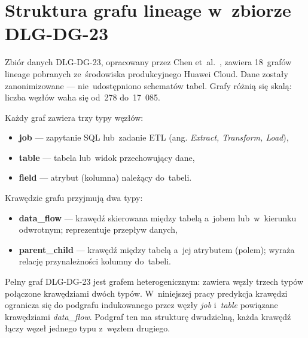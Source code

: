 \documentclass[polish,master,a4paper,oneside]{ppfcmthesis}
\begin{document}
\section{Struktura grafu lineage w~zbiorze DLG-DG-23}
\label{sec:graf_lineage}

Zbiór danych DLG-DG-23, opracowany przez Chen et~al.~\cite{Chen2024},
zawiera 18~grafów lineage pobranych ze~środowiska produkcyjnego Huawei
Cloud. Dane zostały zanonimizowane — nie~udostępniono schematów tabel.
Grafy różnią się skalą: liczba węzłów waha się od~278 do~17~085.

Każdy graf zawiera trzy typy węzłów:

\begin{itemize}
  \item \textbf{job} — zapytanie SQL lub~zadanie ETL (ang. \emph{Extract,
        Transform, Load}),
  \item \textbf{table} — tabela lub~widok przechowujący dane,
  \item \textbf{field} — atrybut (kolumna) należący do~tabeli.
\end{itemize}

Krawędzie grafu przyjmują dwa typy:

\begin{itemize}
  \item \textbf{data\_flow} — krawędź skierowana między tabelą a~jobem
        lub~w~kierunku odwrotnym; reprezentuje przepływ danych,
  \item \textbf{parent\_child} — krawędź między tabelą a~jej atrybutem
        (polem); wyraża relację przynależności kolumny do~tabeli.
\end{itemize}

Pełny graf DLG-DG-23 jest grafem heterogenicznym: zawiera węzły trzech
typów połączone krawędziami dwóch typów. W~niniejszej pracy predykcja
krawędzi ogranicza się do podgrafu indukowanego przez węzły \textit{job}
i~\textit{table} powiązane krawędziami \textit{data\_flow}. Podgraf ten
ma strukturę dwudzielną, każda krawędź łączy węzeł jednego typu
z~węzłem drugiego.


\end{document}

